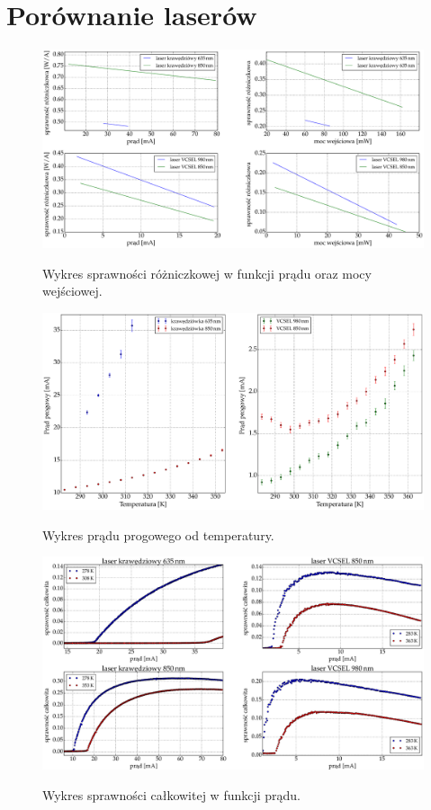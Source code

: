 \section{Porównanie laserów}
\begin{figure}
\center
  \includegraphics[scale=0.30]{plot_common/plot_eff.eps}
  \label{rys1}
  \caption{Wykres sprawności różniczkowej w funkcji prądu oraz mocy wejściowej.}
\end{figure}
\begin{figure}
\center
  \includegraphics[scale=0.30]{plot_common/plot_temp_i_th.eps}
  \label{rys1}
  \caption{Wykres prądu progowego od temperatury.}
\end{figure}
\begin{figure}
\center
  \includegraphics[scale=0.30]{plot_common/plot_wall_eff.eps}
  \label{rys1}
  \caption{Wykres sprawności całkowitej w funkcji prądu.}
\end{figure}